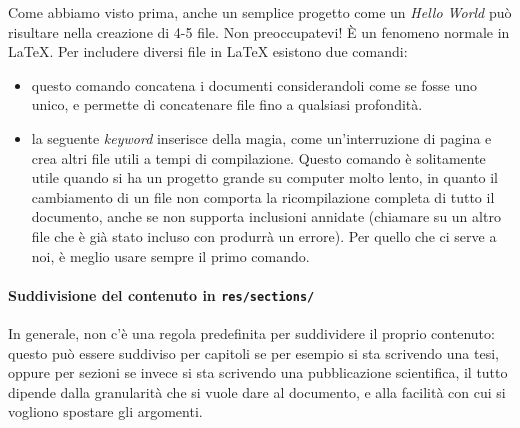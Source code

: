 Come abbiamo visto prima, anche un semplice progetto come un \textit{Hello
World} può risultare nella creazione di 4-5 file. Non preoccupatevi! È un
fenomeno normale in \LaTeX{}.
Per includere diversi file in \LaTeX{} esistono due comandi:
\begin{itemize}
 \item \verb!! questo comando concatena i documenti considerandoli
come se fosse uno unico, e permette di concatenare file fino a qualsiasi
profondità.
 \item \verb!! la seguente \textit{keyword} inserisce della magia,
come un'interruzione di pagina e crea altri file utili a tempi di
compilazione. Questo comando è solitamente utile quando si ha un progetto
grande su computer molto lento, in quanto il cambiamento di un file non
comporta la ricompilazione completa di tutto il documento, anche se non
supporta inclusioni annidate (chiamare \verb!! su un altro file che
è già stato incluso con \verb!! produrrà un errore). Per quello che
ci serve a noi, è meglio usare sempre il primo comando.
\end{itemize}

\paragraph*{Suddivisione del contenuto in \texttt{res/sections/}} In generale,
non c'è una regola predefinita per suddividere il proprio contenuto: questo può
essere suddiviso per capitoli se per esempio si sta scrivendo una tesi, oppure
per sezioni se invece si sta scrivendo una pubblicazione scientifica, il tutto
dipende dalla granularità che si vuole dare al documento, e alla facilità con
cui si vogliono spostare gli argomenti.
